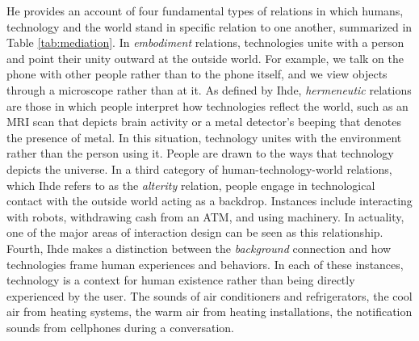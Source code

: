 He provides an account of four fundamental types of relations in which humans, technology and the world stand in specific relation to one another, summarized in Table \ref{tab:mediation}. In \emph{embodiment} relations, technologies unite with a person and point their unity outward at the outside world. For example, we talk on the phone with other people rather than to the phone itself, and we view objects through a microscope rather than at it.
As defined by Ihde, \emph{hermeneutic} relations are those in which people interpret how technologies reflect the world, such as an MRI scan that depicts brain activity or a metal detector's beeping that denotes the presence of metal. In this situation, technology unites with the environment rather than the person using it. People are drawn to the ways that technology depicts the universe.
In a third category of human-technology-world relations, which Ihde refers to as the \emph{alterity} relation, people engage in technological contact with the outside world acting as a backdrop. Instances include interacting with robots, withdrawing cash from an ATM, and using machinery. In actuality, one of the major areas of interaction design can be seen as this relationship.
Fourth, Ihde makes a distinction between the \emph{background} connection and how technologies frame human experiences and behaviors. In each of these instances, technology is a context for human existence rather than being directly experienced by the user. The sounds of air conditioners and refrigerators, the cool air from heating systems, the warm air from heating installations, the notification sounds from cellphones during a conversation. 

